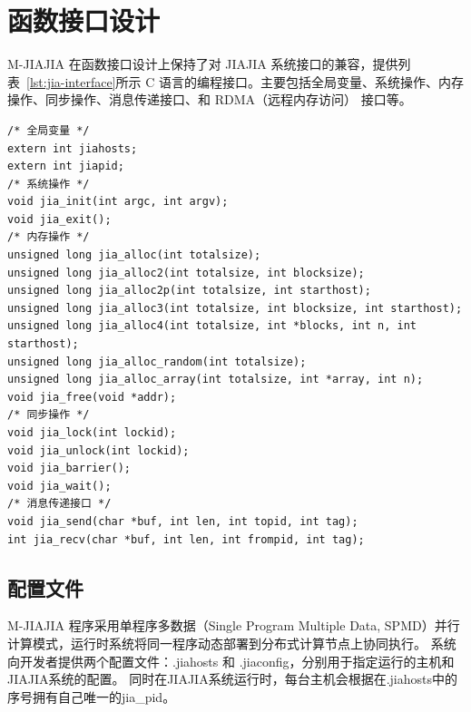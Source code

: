 {    \section{函数接口设计}
    M-JIAJIA 在函数接口设计上保持了对 JIAJIA 系统接口的兼容，提供列表~\ref{lst:jia-interface}所示 C 语言的编程接口。主要包括全局变量、系统操作、内存操作、同步操作、消息传递接口、和 RDMA（远程内存访问） 接口等。
    \begin{lstlisting}[style=CStyle, caption={M-JIAJIA C 接口总览}, label={lst:jia-interface}]
/* 全局变量 */
extern int jiahosts;
extern int jiapid;
/* 系统操作 */
void jia_init(int argc, int argv);
void jia_exit();
/* 内存操作 */
unsigned long jia_alloc(int totalsize);
unsigned long jia_alloc2(int totalsize, int blocksize);
unsigned long jia_alloc2p(int totalsize, int starthost);
unsigned long jia_alloc3(int totalsize, int blocksize, int starthost);
unsigned long jia_alloc4(int totalsize, int *blocks, int n, int starthost);
unsigned long jia_alloc_random(int totalsize);
unsigned long jia_alloc_array(int totalsize, int *array, int n);
void jia_free(void *addr);
/* 同步操作 */
void jia_lock(int lockid);
void jia_unlock(int lockid);
void jia_barrier();
void jia_wait();
/* 消息传递接口 */
void jia_send(char *buf, int len, int topid, int tag);
int jia_recv(char *buf, int len, int frompid, int tag);
    \end{lstlisting}

    \subsection{配置文件}
    M-JIAJIA 程序采用单程序多数据（Single Program Multiple Data, SPMD）并行计算模式，运行时系统将同一程序动态部署到分布式计算节点上协同执行。
    系统向开发者提供两个配置文件：.jiahosts 和 .jiaconfig，分别用于指定运行的主机和JIAJIA系统的配置。
    同时在JIAJIA系统运行时，每台主机会根据在.jiahosts中的序号拥有自己唯一的jia\_pid。

}

